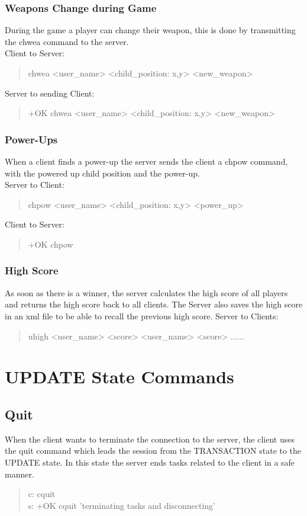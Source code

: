 \documentclass[a4paper,11pt]{article}
\begin{document}
\subsubsection{Weapons Change during Game}
During the game a player can change their weapon, this is done by transmitting the chwea command to the server.\\
Client to Server:
\begin{quote}
  chwea <user\_name> <child\_position: x,y> <new\_weapon>
\end{quote}
\noindent
Server to sending Client:
\begin{quote}
  +OK chwea <user\_name> <child\_position: x,y> <new\_weapon>
\end{quote}

\subsubsection{Power-Ups}
When a client finds a power-up the server sends the client a chpow command, with the powered up child position and the power-up.\\
Server to Client:
\begin{quote}
  chpow <user\_name> <child\_position: x,y> <power\_up>
\end{quote}
\noindent
Client to Server:
\begin{quote}
  +OK chpow
\end{quote}

\subsubsection{High Score}
As soon as there is a winner, the server calculates the high score of all players and returns the high score back to all clients. The Server also saves the high score in an xml file to be able to recall the previous high score.
Server to Clients:
\begin{quote}
  uhigh <user\_name> <score> <user\_name> <score> ......
\end{quote} 


\clearpage
\section{UPDATE State Commands}
\subsection{Quit}
When the client wants to terminate the connection to the server, the client uses the quit command which leads the session from the TRANSACTION state to the UPDATE state. In this state the server ends tasks related to the client in a safe manner.

\begin{quote}
  c: cquit\\
  s: +OK cquit 'terminating tasks and disconnecting'
\end{quote}
\end{document}
